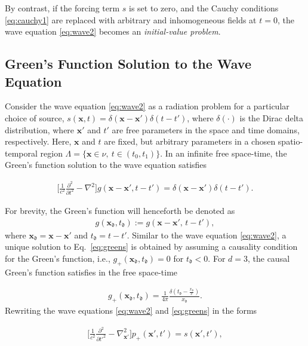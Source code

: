 \documentclass[11pt,reqno]{amsart}
\theoremstyle{remark}
\theoremstyle{italic_lemma}
\newcommand{\bx}{\boldsymbol{x}}
\newcommand{\fd}{\mathfrak{d}}
\begin{document}
By contrast, if the forcing term $s$ is set to zero, and the Cauchy conditions \eqref{eq:cauchy1} are replaced with arbitrary and inhomogeneous fields at $t=0$, the wave equation \eqref{eq:wave2} becomes an \textit{initial-value problem}.

\subsection{Green's Function Solution to the Wave Equation} \label{sec:gr}
Consider the wave equation \eqref{eq:wave2} as a radiation problem for a particular choice of source, $s(\bx, t) = \delta(\bx - \bx') \delta(t - t')$, where $\delta(\cdot)$ is the Dirac delta distribution, where $\bx'$ and $t'$ are free parameters in the space and time domains, respectively. Here, $\bx$ and $t$ are fixed, but arbitrary parameters in a chosen spatio-temporal region $\Lambda = \{\bx \in \nu, \ t \in (t_0, t_1)\}$. In an infinite free space-time, the Green's function solution to the wave equation satisfies

\begin{align}  \label{eq:greens}
    \bigg[ \frac{1}{c^2} \frac{\partial^2}{\partial t^2} - \nabla^2 \bigg] g(\bx - \bx', t - t') = \delta(\bx - \bx') \delta(t - t').
\end{align}

\noindent
For brevity, the Green's function will henceforth be denoted as
\begin{align} \label{eq:recipro}
    g(\bx_{\fd}, t_{\fd}) := g(\bx - \bx',\, t - t'),
\end{align}
where $\bx_{\fd} = \bx - \bx'$ and $t_{\fd} = t - t'$.
 Similar to the wave equation \eqref{eq:wave2}, a unique solution to Eq.~\eqref{eq:greens} is obtained by assuming a causality condition for the Green's function, i.e., $g_+(\bx_{\fd}, t_{\fd}) = 0$ for $t_{\fd} < 0$. For $d=3$, the causal Green's function satisfies in the free space-time

\begin{align} \label{eq:greens-3d-time}
    g_+(\bx_{\fd}, t_{\fd}) = \frac{1}{4 \pi} \frac{\delta(t_{\fd} - \frac{x_{\fd}}{c})}{x_{\fd}}.
\end{align}
\noindent
Rewriting the wave equations \eqref{eq:wave2} and \eqref{eq:greens} in the forms

\begin{align}  \label{eq:wave4}
    \bigg[ \frac{1}{c^2} \frac{\partial^2}{\partial {t'}^2} - \nabla_{\bx'}^2 \bigg] p_{+}(\bx', t') = s(\bx', t'),
\end{align}
\end{document}
